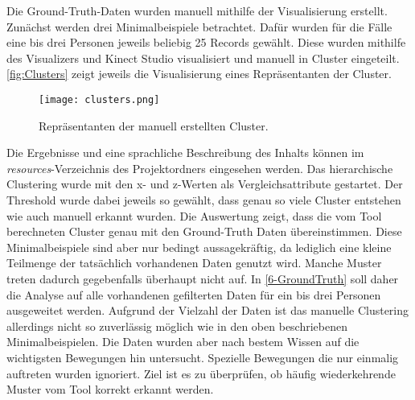 Die Ground-Truth-Daten wurden manuell mithilfe der Visualisierung erstellt.
Zunächst werden drei Minimalbeispiele betrachtet.
Dafür wurden für die Fälle eine bis drei Personen jeweils beliebig 25 Records gewählt.
Diese wurden mithilfe des Visualizers und Kinect Studio visualisiert und manuell in Cluster eingeteilt.
\autoref{fig:Clusters} zeigt jeweils die Visualisierung eines Repräsentanten der Cluster.
\begin{figure}[ht]
    \begin{center}
    \texttt{[image: clusters.png]}
    \end{center}
    \caption{Repräsentanten der manuell erstellten Cluster.}
    \label{fig:Clusters}
\end{figure}
Die Ergebnisse und eine sprachliche Beschreibung des Inhalts
können im \emph{resources}-Verzeichnis des Projektordners eingesehen werden.
Das hierarchische Clustering wurde mit den x- und z-Werten als Vergleichsattribute gestartet.
Der Threshold wurde dabei jeweils so gewählt,
dass genau so viele Cluster entstehen wie auch manuell erkannt wurden.
Die Auswertung zeigt, dass die vom Tool berechneten Cluster genau mit den Ground-Truth Daten übereinstimmen.
Diese Minimalbeispiele sind aber nur bedingt aussagekräftig,
da lediglich eine kleine Teilmenge der tatsächlich vorhandenen Daten genutzt wird.
Manche Muster treten dadurch gegebenfalls überhaupt nicht auf.
In \autoref{6-GroundTruth} soll daher die Analyse auf alle vorhandenen gefilterten Daten
für ein bis drei Personen ausgeweitet werden.
Aufgrund der Vielzahl der Daten ist das manuelle Clustering allerdings nicht so
zuverlässig möglich wie in den oben beschriebenen Minimalbeispielen.
Die Daten wurden aber nach bestem Wissen auf die wichtigsten Bewegungen hin untersucht.
Spezielle Bewegungen die nur einmalig auftreten wurden ignoriert.
Ziel ist es zu überprüfen,
ob häufig wiederkehrende Muster vom Tool korrekt erkannt werden.

